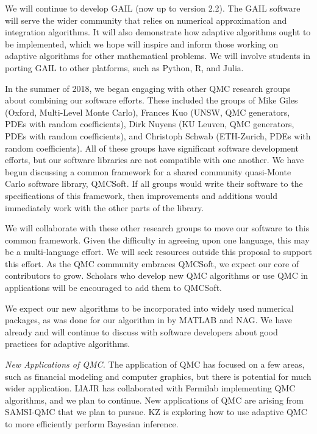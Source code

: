 \documentclass[11pt]{NSFamsart}
\newcommand{\QMCSoft}{QMCSoft\xspace}
\newcommand{\GAIL}{GAIL\xspace}
\newcommand{\QMC}{QMC\xspace}
\newcommand{\SAMSIQMC}{SAMSI-QMC\xspace}
\newcommand{\NAG}{NAG\xspace}
\newcommand{\MATLAB}{MATLAB\xspace}
\newcommand{\Rlang}{R\xspace}
\newcommand{\Julia}{Julia\xspace}
\begin{document}
We will continue to develop \GAIL \citep{ChoEtal17b} (now up to version 2.2).  The \GAIL software 
will serve the wider community that relies on numerical approximation and integration algorithms.  It will 
also demonstrate how adaptive algorithms ought to be implemented, which we hope will inspire and 
inform those working on adaptive algorithms for other mathematical problems.  We will involve 
students in porting \GAIL to other platforms, such as Python, \Rlang, and \Julia.  

In the summer of 2018, we began engaging with other \QMC research groups about combining our software efforts.  These included the groups of Mike Giles (Oxford, Multi-Level Monte Carlo),  Frances Kuo (UNSW, \QMC generators, PDEs with random coefficients),  Dirk Nuyens (KU Leuven, \QMC generators, PDEs with random coefficients), and Christoph Schwab (ETH-Zurich, PDEs with random coefficients).  All of these groups have significant software development efforts, but our software libraries are not compatible with one another.  We have begun discussing a common framework for a shared community quasi-Monte Carlo software library, \QMCSoft.  If all groups would write their software to the specifications of this framework, then improvements and additions would immediately work with the other parts of the library.

We will collaborate with these other research groups to move our software to this common framework.  Given the difficulty in agreeing upon one language, this may be a multi-language effort.  We will seek resources outside this proposal to support this effort.  As the \QMC community embraces \QMCSoft, we expect our core of contributors to grow.  Scholars who develop new \QMC algorithms or use \QMC in applications will be encouraged to add them to \QMCSoft.  

We expect our new algorithms to be incorporated into widely used numerical packages, as was done for our algorithm in \cite{HonHic00a} by \MATLAB and \NAG.  We have already and will continue 
to discuss with software developers about good practices for adaptive algorithms.


\emph{New Applications of \QMC.}
The application of \QMC has focused on a few areas, such as financial modeling and computer 
graphics, but there is potential for much wider application.  LlAJR has collaborated with Fermilab implementing \QMC algorithms, and we plan to continue.    New applications of \QMC are arising from \SAMSIQMC that we plan to pursue.  KZ is exploring how to use adaptive \QMC to more efficiently perform Bayesian inference.


\newpage
\clearpage
\setcounter{page}{1}




{\renewcommand\addcontentsline[3]{} 
\renewcommand{\refname}{{\Large\textbf{References Cited}}}                   %
\renewcommand{\bibliofont}{\normalsize}

}
\end{document}
